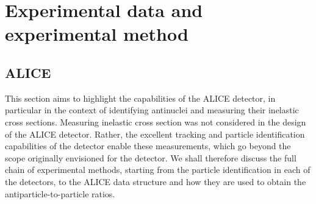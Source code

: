 \section{Experimental data and experimental method}\label{sec:ExperimentAndMethod}

\subsection{ALICE}
This section aims to highlight the capabilities of the ALICE detector, in particular in the context of identifying antinuclei and measuring their inelastic cross sections. Measuring inelastic cross section was not considered in the design of the ALICE detector. Rather, the excellent tracking and particle identification capabilities of the detector enable these measurements, which go beyond the scope originally envisioned for the detector. We shall therefore discuss the full chain of experimental methods, starting from the particle identification in each of the detectors, to the ALICE data structure and how they are used to obtain the antiparticle-to-particle ratios. 

